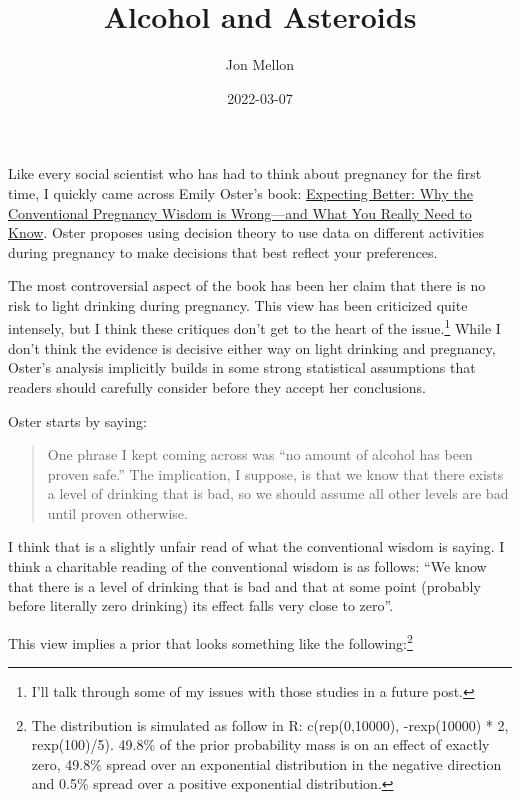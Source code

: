 \documentclass[
]{article}
\title{Alcohol and Asteroids}
\author{Jon Mellon}
\date{2022-03-07}
\begin{document}
\maketitle

Like every social scientist who has had to think about pregnancy for the first time, I quickly came across Emily Oster's book: \href{https://www.goodreads.com/book/show/16158576-expecting-better?from_search=true\&from_srp=true\&qid=5FmElbF5mM\&rank=1}{Expecting Better: Why the Conventional Pregnancy Wisdom is Wrong---and What You Really Need to Know}. Oster proposes using decision theory to use data on different activities during pregnancy to make decisions that best reflect your preferences.

The most controversial aspect of the book has been her claim that there is no risk to light drinking during pregnancy. This view has been criticized quite intensely, but I think these critiques don't get to the heart of the issue.\footnote{I'll talk through some of my issues with those studies in a future post.} While I don't think the evidence is decisive either way on light drinking and pregnancy, Oster's analysis implicitly builds in some strong statistical assumptions that readers should carefully consider before they accept her conclusions.

Oster starts by saying:

\begin{quote}
One phrase I kept coming across was ``no amount of alcohol has been proven safe.'' The implication, I suppose, is that we know that there exists a level of drinking that is bad, so we should assume all other levels are bad until proven otherwise.
\end{quote}

I think that is a slightly unfair read of what the conventional wisdom is saying. I think a charitable reading of the conventional wisdom is as follows: ``We know that there is a level of drinking that is bad and that at some point (probably before literally zero drinking) its effect falls very close to zero''.

This view implies a prior that looks something like the following:\footnote{The distribution is simulated as follow in R: c(rep(0,10000), -rexp(10000) * 2, rexp(100)/5). 49.8\% of the prior probability mass is on an effect of exactly zero, 49.8\% spread over an exponential distribution in the negative direction and 0.5\% spread over a positive exponential distribution.}
\end{document}
